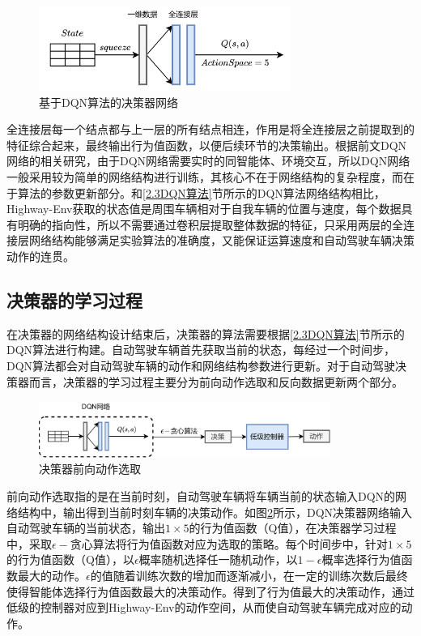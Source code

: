 \begin{figure}[htbp]
    \vspace{13pt}
    \centering
    \includegraphics[width=0.73\textwidth]{images/chapter3/highway_decision.png}
    \caption{基于DQN算法的决策器网络}\label{DQN算法的决策器网络} %
\end{figure}  

全连接层每一个结点都与上一层的所有结点相连，作用是将全连接层之前提取到的特征综合起来，最终输出行为值函数，以便后续环节的决策输出。根据前文DQN网络的相关研究，由于DQN网络需要实时的同智能体、环境交互，所以DQN网络一般采用较为简单的网络结构进行训练，其核心不在于网络结构的复杂程度，而在于算法的参数更新部分。和\ref{2.3DQN算法}节所示的DQN算法网络结构相比，Highway-Env获取的状态值是周围车辆相对于自我车辆的位置与速度，每个数据具有明确的指向性，所以不需要通过卷积层提取整体数据的特征，只采用两层的全连接层网络结构能够满足实验算法的准确度，又能保证运算速度和自动驾驶车辆决策动作的连贯。

\subsection{决策器的学习过程}

在决策器的网络结构设计结束后，决策器的算法需要根据\ref{2.3DQN算法}节所示的DQN算法进行构建。自动驾驶车辆首先获取当前的状态，每经过一个时间步，DQN算法都会对自动驾驶车辆的动作和网络结构参数进行更新。对于自动驾驶决策器而言，决策器的学习过程主要分为前向动作选取和反向数据更新两个部分。

\begin{figure}[htbp]
    \vspace{13pt}
    \centering
    \includegraphics[width=0.85\textwidth]{images/chapter3/highway_forward.png}
    \caption{决策器前向动作选取}\label{决策器前向} %
\end{figure}  

前向动作选取指的是在当前时刻，自动驾驶车辆将车辆当前的状态输入DQN的网络结构中，输出得到当前时刻车辆的决策动作。如图\ref{决策器前向}所示，DQN决策器网络输入自动驾驶车辆的当前状态，输出$1 \times 5$的行为值函数（Q值），在决策器学习过程中，采取$\epsilon-$贪心算法将行为值函数对应为选取的策略。每个时间步中，针对$1 \times 5$的行为值函数（Q值），以$\epsilon$概率随机选择任一随机动作，以$1-\epsilon$概率选择行为值函数最大的动作。$\epsilon$的值随着训练次数的增加而逐渐减小，在一定的训练次数后最终使得智能体选择行为值函数最大的决策动作。得到了行为值最大的决策动作，通过低级的控制器对应到Highway-Env的动作空间，从而使自动驾驶车辆完成对应的动作。

